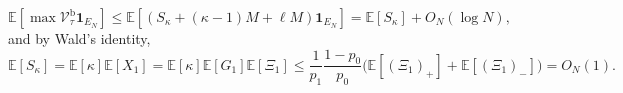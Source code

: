 \[
    \mathbb E\!\left[\max\mathcal V_\tau^{\mathrm b}\mathbf 1_{E_N}\right]
    \le
    \mathbb E\!\left[\left(S_\kappa+(\kappa-1)M+\ell M\right)\mathbf 1_{E_N}\right]
    =
    \mathbb E[S_\kappa]+O_N(\log N),
\]
and by Wald's identity,
\[
    \mathbb E[S_\kappa]
    =
    \mathbb E[\kappa]\mathbb E[X_1]
    =
    \mathbb E[\kappa]\mathbb E[G_1]\mathbb E[\Xi_1]
    \le
    \frac{1}{p_1}\frac{1-p_0}{p_0}\Big(\mathbb E[(\Xi_1)_+]+\mathbb E[(\Xi_1)_-]\Big)
    =
    O_N(1).
\]

